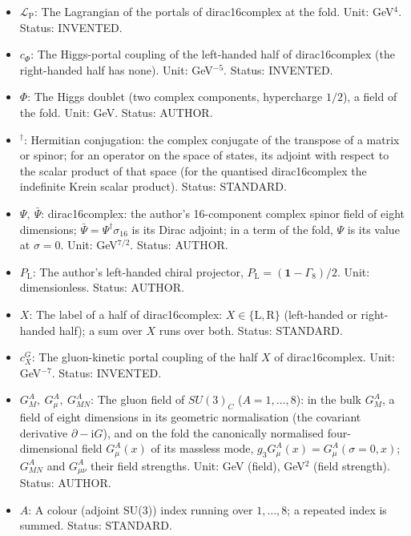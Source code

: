 \documentclass[
  10pt,
]{article}
\providecommand{\tightlist}{%
  \setlength{\itemsep}{0pt}\setlength{\parskip}{0pt}}
\begin{document}
\begin{itemize}
\tightlist
\item
  \(\mathcal{L}_{\mathrm{P}}\): The Lagrangian of the portals of
  dirac16complex at the fold. Unit: GeV\(^4\). Status: INVENTED.
\item
  \(c_\Phi\): The Higgs-portal coupling of the left-handed half of
  dirac16complex (the right-handed half has none). Unit: GeV\(^{-5}\).
  Status: INVENTED.
\item
  \(\Phi\): The Higgs doublet (two complex components, hypercharge
  \(1/2\)), a field of the fold. Unit: GeV. Status: AUTHOR.
\item
  \({}^\dagger\): Hermitian conjugation: the complex conjugate of the
  transpose of a matrix or spinor; for an operator on the space of
  states, its adjoint with respect to the scalar product of that space
  (for the quantised dirac16complex the indefinite Krein scalar
  product). Status: STANDARD.
\item
  \(\Psi,\ \bar\Psi\): dirac16complex: the author's 16-component complex
  spinor field of eight dimensions;
  \(\bar\Psi = \Psi^\dagger\sigma_{16}\) is its Dirac adjoint; in a term
  of the fold, \(\Psi\) is its value at \(\sigma = 0\). Unit:
  GeV\(^{7/2}\). Status: AUTHOR.
\item
  \(P_{\mathrm{L}}\): The author's left-handed chiral projector,
  \(P_{\mathrm{L}} = (\mathbf{1} - \Gamma_8)/2\). Unit: dimensionless.
  Status: AUTHOR.
\item
  \(X\): The label of a half of dirac16complex:
  \(X \in \{\mathrm{L}, \mathrm{R}\}\) (left-handed or right-handed
  half); a sum over \(X\) runs over both. Status: STANDARD.
\item
  \(c^{G}_X\): The gluon-kinetic portal coupling of the half \(X\) of
  dirac16complex. Unit: GeV\(^{-7}\). Status: INVENTED.
\item
  \(G^A_M,\ G^A_\mu,\ G^A_{MN}\): The gluon field of \(SU(3)_C\)
  (\(A = 1, \dots, 8\)): in the bulk \(G^A_M\), a field of eight
  dimensions in its geometric normalisation (the covariant derivative
  \(\partial - \mathrm{i}G\)), and on the fold the canonically
  normalised four-dimensional field \(G^A_\mu(x)\) of its massless mode,
  \(g_3G^A_\mu(x) = G^A_\mu(\sigma = 0, x)\); \(G^A_{MN}\) and
  \(G^A_{\mu\nu}\) their field strengths. Unit: GeV (field), GeV\(^2\)
  (field strength). Status: AUTHOR.
\item
  \(A\): A colour (adjoint SU(3)) index running over \(1, \dots, 8\); a
  repeated index is summed. Status: STANDARD.

\end{itemize}
\end{document}
